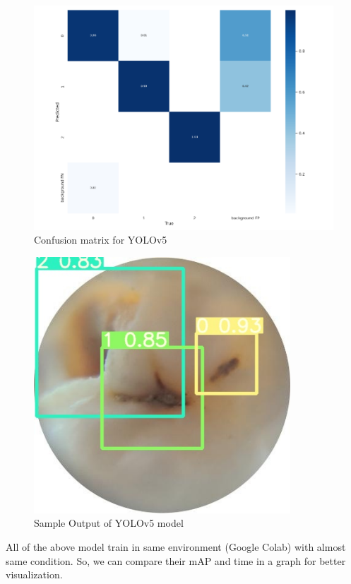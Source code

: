 \begin{figure}[H]
    \centering
    \includegraphics[scale=1]{55_chapter_5/y5.png}
    \caption{Confusion matrix for YOLOv5}
    \label{YOLOv5s}
\end{figure}
\begin{figure}[H]
    \centering
    \includegraphics[scale=1]{55_chapter_5/y6.png}
    \caption{Sample Output of YOLOv5 model }
    \label{YOLOv5s}
\end{figure}
All of the above model train in same environment (Google Colab) with almost same condition. So, we can compare their mAP and time in a graph for better visualization.\
